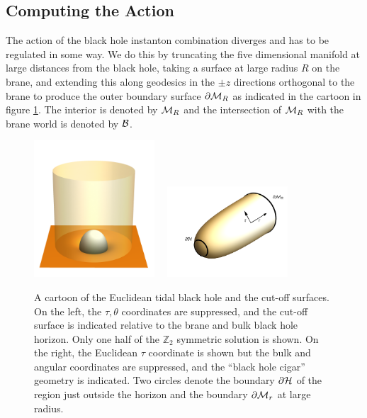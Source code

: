\documentclass[aps,12pt,prd,superscriptaddress,preprintnumbers, 
	amssymb,
	amsmath,
	notitlepage,
	longbibliography,
	nofootinbib]{revtex4-1}
\begin{document}
\subsection{Computing the Action}

The action of the black hole instanton combination diverges and has to 
be regulated in some way. We do this by truncating the five dimensional
manifold at large distances from the black hole, taking a surface at
large radius $R$ on the brane, and extending this along geodesics 
in the $\pm z$ directions orthogonal to the brane to produce the outer 
boundary surface ${\partial\cal M}_R$ as indicated in the cartoon in 
figure \ref{fig:cartoon}. The interior is denoted by ${\cal M}_R$ 
and the intersection of ${\cal M}_R$ with the brane world is 
denoted by ${\cal B}$.
\begin{figure}[htb]
\begin{center}
\includegraphics[width=0.4\textwidth]{cartoon.pdf}~~
\includegraphics[width=0.4\textwidth]{cartoontau.pdf}
\caption{A cartoon of the Euclidean tidal black hole and the cut-off surfaces.
On the left, the $\tau, \theta$ coordinates are suppressed, and the cut-off
surface is indicated relative to the brane and bulk black hole horizon. 
Only one half of the $\mathbb{Z}_2$ symmetric solution is shown.
On the right, the Euclidean $\tau$ coordinate is shown but the bulk and angular
coordinates are suppressed, and the ``black hole cigar'' geometry is indicated. 
Two circles denote the boundary ${\partial \cal H}$ of the region just outside the 
horizon and the boundary ${\partial \cal M}_r$ at large radius.}
\label{fig:cartoon}
\end{center}
\end{figure}
\end{document}
